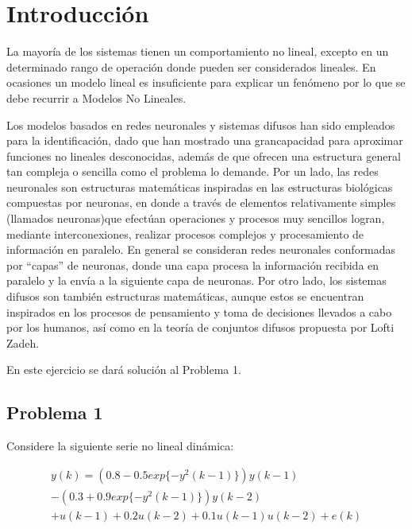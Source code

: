 \documentclass[12pt]{article}
\begin{document}

\tableofcontents
\listoffigures
\listoftables
\afterpage{\null\newpage}
\newpage
\thispagestyle{empty}
\pagebreak
\newpage
\setcounter{page}{1}


\section{Introducción}

La  mayoría  de  los  sistemas  tienen  un  comportamiento  no  lineal,  excepto  en  un determinado rango de operación donde pueden ser considerados lineales. En ocasiones un modelo lineal es insuficiente para explicar un fenómeno por lo que se debe recurrir a Modelos No Lineales.

Los modelos basados en redes neuronales y sistemas difusos han sido empleados para la identificación, dado que han mostrado una grancapacidad para aproximar funciones no lineales desconocidas, además de que ofrecen una estructura general tan compleja o sencilla como el problema lo demande. Por un lado, las redes neuronales son estructuras matemáticas inspiradas en las estructuras biológicas compuestas por neuronas, en donde a través de elementos relativamente simples (llamados neuronas)que efectúan operaciones y procesos muy sencillos logran, mediante interconexiones, realizar procesos complejos y procesamiento de información en paralelo. En general se consideran redes neuronales conformadas por “capas” de neuronas, donde una capa procesa la información recibida en paralelo y la envía a la siguiente capa de neuronas. Por otro lado, los sistemas difusos son también estructuras matemáticas, aunque estos se encuentran inspirados en los procesos de pensamiento y toma de decisiones llevados a cabo por los humanos, así como en la teoría de conjuntos difusos propuesta por Lofti Zadeh.

En este ejercicio se dará solución al Problema 1.


\subsection{Problema 1}

Considere la siguiente serie no lineal dinámica:

\begin{align}
y(k)= (0.8 - 0.5 exp\{-y^2(k- 1)\})y(k - 1)\nonumber \\
-(0.3 + 0.9 exp\{-y^2(k - 1)\})y(k - 2)\nonumber \\
+u(k - 1) + 0.2u(k - 2) + 0.1u(k - 1)u(k - 2) + e(k)
\label{e_serie}
\end{align}
\end{document}
